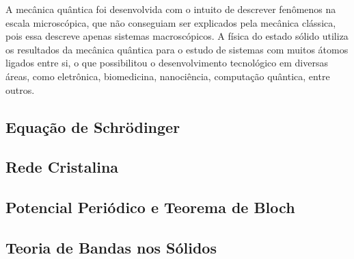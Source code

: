 \par A mecânica quântica foi desenvolvida com o intuito de descrever fenômenos na escala microscópica, que não conseguiam ser explicados pela mecânica clássica, pois essa descreve apenas sistemas macroscópicos. A física do estado sólido utiliza os resultados da mecânica quântica para o estudo de sistemas com muitos átomos ligados entre si, o que possibilitou o desenvolvimento tecnológico em diversas áreas, como eletrônica, biomedicina, nanociência, computação quântica, entre outros.\cite{qm_fis1}

	\subsection{Equação de Schrödinger}

    

  \subsection{Rede Cristalina}

    

  \subsection{Potencial Periódico e Teorema de Bloch}

    

  \subsection{Teoria de Bandas nos Sólidos}

    
